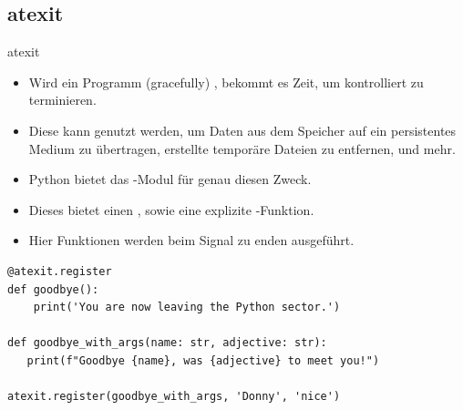 \documentclass[12pt, aspectratio=169, usepdftitle=false]{beamer}
\newcommand{\pp}[1]{\lpl{#1}}
\begin{document}
\subsection{atexit}
\begin{frame}[fragile]{atexit}
	\begin{itemize}
		\item Wird ein Programm (gracefully) , bekommt es Zeit, um kontrolliert zu terminieren.
		\pause
		\item Diese  kann genutzt werden, um Daten aus dem Speicher auf ein persistentes Medium zu übertragen, erstellte temporäre Dateien zu entfernen, und mehr.
		\pause
		\item Python bietet das \pp{atexit}-Modul für genau diesen Zweck.
		\pause
		\item Dieses bietet einen , sowie eine explizite \pp{register}-Funktion.
		\pause
		\item Hier  Funktionen werden beim Signal zu enden ausgeführt.
		\pause
	\end{itemize}
 \begin{lstlisting}[language=pytiny]
@atexit.register
def goodbye():
    print('You are now leaving the Python sector.')	

def goodbye_with_args(name: str, adjective: str):
   print(f"Goodbye {name}, was {adjective} to meet you!")

atexit.register(goodbye_with_args, 'Donny', 'nice')
	\end{lstlisting}
\end{frame}




	
	
	
	
\end{document}
